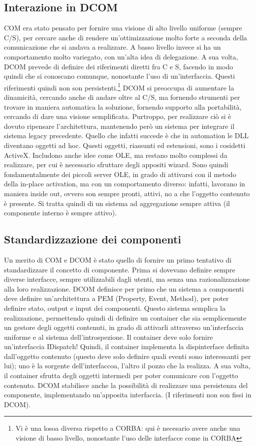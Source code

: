 \subsection{Interazione in DCOM}
COM era stato pensato per fornire una visione di alto livello uniforme (sempre C/S), per cercare anche di rendere 
un'ottimizzazione molto forte a seconda della comunicazione che si andava a realizzare. A basso livello invece si ha un
comportamento molto variegato, con un'alta idea di delegazione.
A sua volta, DCOM prevede di definire dei riferimenti diretti fra C e S, facendo in modo quindi che si conoscano 
comunque, nonostante l'uso di un'interfaccia. Questi riferimenti quindi non son persistenti.\footnote{Vi è una losoa 
diversa rispetto a CORBA: qui è necesario avere anche una visione di basso livello, nonostante l'uso delle interfacce 
come in CORBA} DCOM si preoccupa di aumentare la dinamicità, cercando anche di andare oltre al C/S, ma fornendo 
strumenti per trovare in maniera automatica la soluzione, fornendo supporto alla portabilità, cercando di dare una 
visione semplificata. Purtroppo, per realizzare ciò si è dovuto ripensare l'architettura, mantenendo però un sistema per 
integrare il sistema legacy precedente.
Quello che infatti succede è che in automation le DLL diventano oggetti ad hoc. Questi oggetti, riassunti ed 
estensioni, sono i cosidetti ActiveX. Includono anche idee come OLE, ma restano molto complessi da realizzare, per cui è
necessario sfruttare degli appositi wizard. Sono quindi fondamentalmente dei piccoli server OLE, in grado di attivarsi 
con il metodo della in-place activation, ma con un comportamento diverso: infatti, lavorano in maniera inside out,
ovvero son sempre pronti, attivi, no a che l'oggetto contenuto è presente. Si tratta quindi di un sistema ad 
aggregazione sempre attiva (il componente interno è sempre attivo).
\subsection{Standardizzazione dei componenti}
Un merito di COM e DCOM è stato quello di fornire un primo tentativo di standardizzare il concetto di componente. Prima 
si dovevano definire sempre diverse interfacce, sempre utilizzabili dagli utenti, ma senza una razionalizzazione alla
loro realizzazione.
DCOM definisce per primo che un sistema a componenti deve definire un'architettura a PEM (Property, Event, Method), per
poter definire stato, output e input dei componenti. Questo sistema semplica la realizzazione, permettendo quindi di 
definire un container che sia semplicemente un gestore degli oggetti contenuti, in grado di attivarli attraverso 
un'interfaccia uniforme e al sistema dell'introspezione. Il container deve solo fornire un'interfaccia IDispatch! 
Quindi, il container implementa la dispinterface definita dall'oggetto contenuto (questo deve solo definire quali eventi 
sono interessanti per lui); uno è la sorgente dell'interfaccoa, l'altro il pozzo che la realizza. A sua volta, il 
container sfrutta degli oggetti intermedi per poter comunicare con l'oggetto contenuto.
DCOM stabilisce anche la possibilità di realizzare una persistenza del componente, implementando un'apposita 
interfaccia. (I riferimenti non son fissi in DCOM).
